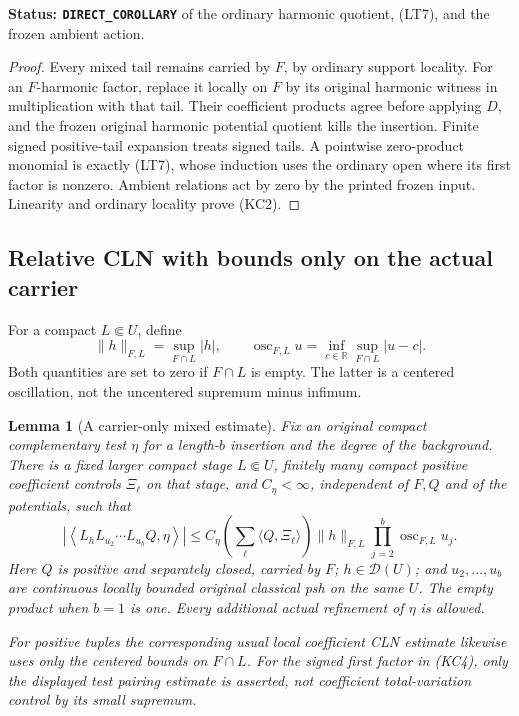 \documentclass[11pt,a4paper]{article}
\numberwithin{equation}{section}
\newtheorem{lemma}[theorem]{Lemma}
\theoremstyle{definition}
\theoremstyle{remark}
\begin{document}
\noindent\textbf{Status: \texttt{DIRECT\_COROLLARY}} of the
ordinary harmonic quotient, (LT7), and the frozen ambient action.

\begin{proof}
Every mixed tail remains carried by \(F\), by ordinary support
locality. For an \(F\)-harmonic factor, replace it locally on \(F\)
by its original harmonic witness in multiplication with that tail.
Their coefficient products agree before applying \(D\), and the
frozen original harmonic potential quotient kills the insertion.
Finite signed positive-tail expansion treats signed tails. A
pointwise zero-product monomial is exactly (LT7), whose induction
uses the ordinary open where its first factor is nonzero.
Ambient relations act by zero by the printed frozen input.
Linearity and ordinary locality prove (KC2).
\end{proof}

\subsection{Relative CLN with bounds only on the actual carrier}

For a compact \(L\Subset U\), define
\[
 \|h\|_{F,L}=\sup_{F\cap L}|h|,\qquad
 \operatorname{osc}_{F,L}u
          =\inf_{c\in\mathbb R}\sup_{F\cap L}|u-c|.
 \tag{KC3}
\]
Both quantities are set to zero if \(F\cap L\) is empty.
The latter is a centered oscillation, not the uncentered
supremum minus infimum.

\begin{lemma}[A carrier-only mixed estimate]
\label{lem:r12-carrier-only-CLN}
Fix an original compact complementary test \(\eta\) for a
length-\(b\) insertion and the degree of the background.
There is a fixed larger compact stage \(L\Subset U\), finitely
many compact positive coefficient controls \(\Xi_\ell\) on that
stage, and \(C_\eta<\infty\), independent of \(F,Q\) and of the
potentials, such that
\[
 \left|\left\langle L_hL_{u_2}\cdots L_{u_b}Q,\eta\right\rangle\right|
 \le C_\eta\left(\sum_\ell\langle Q,\Xi_\ell\rangle\right)
       \|h\|_{F,L}\prod_{j=2}^b\operatorname{osc}_{F,L}u_j.
 \tag{KC4}
\]
Here \(Q\) is positive and separately closed, carried by \(F\);
\(h\in\mathcal D(U)\); and \(u_2,\ldots,u_b\) are continuous
locally bounded original classical psh on the same \(U\).
The empty product when \(b=1\) is one. Every additional actual
refinement of \(\eta\) is allowed.

For positive tuples the corresponding usual local coefficient
CLN estimate likewise uses only the centered bounds on \(F\cap L\).
For the signed first factor in (KC4), only the displayed test
pairing estimate is asserted, not coefficient total-variation
control by its small supremum.
\end{lemma}
\end{document}
